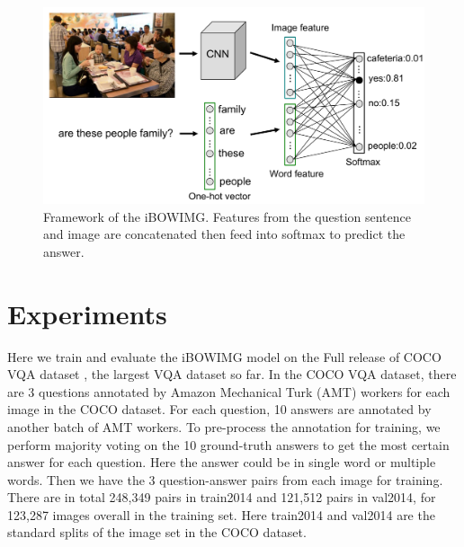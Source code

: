 \documentclass{article} %
\begin{document}
\begin{figure}
\begin{center}
\includegraphics[width=0.9\linewidth]{framework.pdf}
\end{center}
\caption{Framework of the iBOWIMG. Features from the question sentence and image are concatenated then feed into softmax to predict the answer.}\label{vqa_framework}
\end{figure}



\section{Experiments}
Here we train and evaluate the iBOWIMG model on the Full release of COCO VQA dataset \cite{antol2015vqa}, the largest VQA dataset so far. In the COCO VQA dataset, there are 3 questions annotated by Amazon Mechanical Turk (AMT) workers for each image in the COCO dataset. For each question, 10 answers are annotated by another batch of AMT workers. To pre-process the annotation for training, we perform majority voting on the 10 ground-truth answers to get the most certain answer for each question. Here the answer could be in single word or multiple words. Then we have the 3 question-answer pairs from each image for training. There are in total 248,349 pairs in train2014 and 121,512 pairs in val2014, for 123,287 images overall in the training set. Here train2014 and val2014 are the standard splits of the image set in the COCO dataset. 
\end{document}
